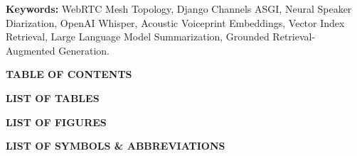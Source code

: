\documentclass[12pt,oneside,letterpaper]{report}
\numberwithin{equation}{chapter} %
\begin{document}
\vspace{0.8cm}
\noindent \textbf{Keywords:} WebRTC Mesh Topology, Django Channels ASGI, Neural Speaker Diarization, OpenAI Whisper, Acoustic Voiceprint Embeddings, Vector Index Retrieval, Large Language Model Summarization, Grounded Retrieval-Augmented Generation.

\newpage
\begin{center}
{\fontsize{14pt}{18pt}\selectfont \textbf{TABLE OF CONTENTS}}\\[1.0cm]
\end{center}
\renewcommand{\contentsname}{}
\vspace{-2.5cm}
\tableofcontents

\newpage
\begin{center}
{\fontsize{14pt}{18pt}\selectfont \textbf{LIST OF TABLES}}\\[1.0cm]
\end{center}
\renewcommand{\listtablename}{}
\vspace{-2.5cm}
\listoftables

\newpage
\begin{center}
{\fontsize{14pt}{18pt}\selectfont \textbf{LIST OF FIGURES}}\\[1.0cm]
\end{center}
\renewcommand{\listfigurename}{}
\vspace{-2.5cm}
\listoffigures

\newpage
\begin{center}
{\fontsize{14pt}{18pt}\selectfont \textbf{LIST OF SYMBOLS \& ABBREVIATIONS}}\\[1.0cm]
\end{center}
\end{document}
